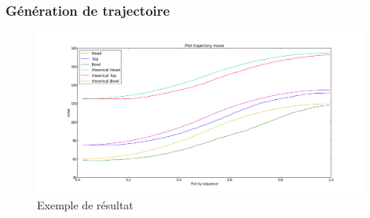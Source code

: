 \begin{frame}
  \frametitle{Génération de trajectoire}
            \begin{figure}
                \begin{center}
                    \includegraphics[width=11cm]{../img/TrajectoryPlot.png}
                \end{center}
                \caption{Exemple de résultat}
            \end{figure}
\end{frame}
